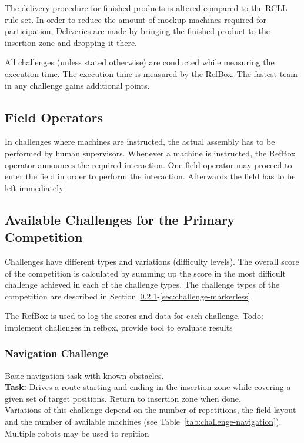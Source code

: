 \documentclass[12pt,twoside]{article}
\newcommand{\refsec}[1]{Section~\ref{#1}}
\newcommand{\reftab}[1]{Table~\ref{#1}}
\begin{document}
The delivery procedure for finished products is altered compared to the
\ac{RCLL} rule set. In order to reduce the amount of mockup machines required
for participation, Deliveries are made by bringing the finished product
to the insertion zone and dropping it there.

All challenges (unless stated otherwise) are conducted while measuring
the execution time. The execution time is measured by the RefBox.
The fastest team in any challenge gains additional points.

\subsection{Field Operators}
In challenges where machines are instructed, the actual assembly has to be
performed by human supervisors. Whenever a machine is instructed, the RefBox
operator announces the required interaction. One field operator may proceed
to enter the field in order to perform the interaction. Afterwards the field
has to be left immediately.

\subsection{Available Challenges for the Primary Competition}
Challenges have different types and variations (difficulty levels).
The overall score of the competition is calculated by summing up the score
in the most difficult challenge achieved in each of the challenge types.
The challenge types of the competition are described in
\refsec{sec:challenge-navigation}-\ref{sec:challenge-markerless}

The RefBox is used to log the scores and data for each challenge.
Todo: implement challenges in refbox, provide tool to evaluate results

\subsubsection{Navigation Challenge}\label{sec:challenge-navigation}
Basic navigation task with known obstacles.\\
\textbf{Task:} Drives a route starting and ending in the insertion zone while
covering a given set of target positions. Return to insertion zone when done.\\
Variations of this challenge depend
on the number of repetitions, the field layout and the number of
available machines (see \reftab{tab:challenge-navigation}).
Multiple robots may be used to repition
\end{document}
